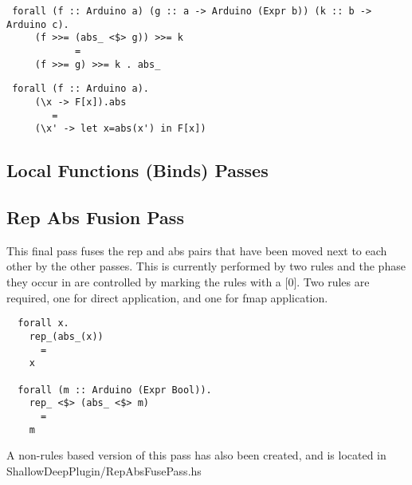 \documentclass[11pt, oneside]{article}   	%
\begin{document}
\begin{verbatim}
 forall (f :: Arduino a) (g :: a -> Arduino (Expr b)) (k :: b -> Arduino c).
     (f >>= (abs_ <$> g)) >>= k
            =
     (f >>= g) >>= k . abs_
\end{verbatim}

\begin{verbatim}
 forall (f :: Arduino a).
     (\x -> F[x]).abs
        =
     (\x' -> let x=abs(x') in F[x])
\end{verbatim}

\subsection{Local Functions (Binds) Passes}

\subsection{Rep Abs Fusion Pass}

This final pass fuses the rep and abs pairs that have been moved next
to each other by the other passes.  This is currently performed by
two rules and the phase they occur in are controlled by marking the rules
with a [0].  Two rules are required, one for direct application, and one for
fmap application.

\begin{verbatim}
  forall x.
    rep_(abs_(x))
      =
    x

  forall (m :: Arduino (Expr Bool)).
    rep_ <$> (abs_ <$> m)
      =
    m
\end{verbatim}

A non-rules based version of this pass has also been created, and is
located in ShallowDeepPlugin/RepAbsFusePass.hs
\end{document}
